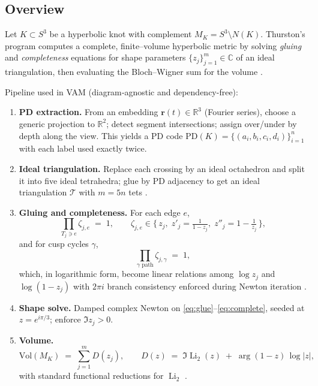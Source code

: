 \documentclass[10pt,reprint,aps,onecolumn,nofootinbib]{revtex4-2}
\begin{document}
\subsection{Overview}
    Let \(K\subset S^3\) be a hyperbolic knot with complement \(M_K = S^3\setminus N(K)\).
    Thurston’s program computes a complete, finite–volume hyperbolic metric by solving \emph{gluing} and \emph{completeness} equations for shape parameters \(\{z_j\}_{j=1}^m\in\mathbb{C}\) of an ideal triangulation, then evaluating the Bloch–Wigner sum for the volume \cite{ThurstonNotes,NeumannZagier1985,AdamsWeeks1992}.

    Pipeline used in VAM (diagram‐agnostic and dependency-free):

    \begin{enumerate}
        \item \textbf{PD extraction.} From an embedding \( \mathbf{r}(t)\in\mathbb{R}^3 \) (Fourier series), choose a generic projection to \(\mathbb{R}^2\); detect segment intersections; assign over/under by depth along the view. This yields a PD code \(\mathrm{PD}(K)=\{(a_i,b_i,c_i,d_i)\}_{i=1}^n\) with each label used exactly twice.
        \item \textbf{Ideal triangulation.} Replace each crossing by an ideal octahedron and split it into five ideal tetrahedra; glue by PD adjacency to get an ideal triangulation \(\mathcal{T}\) with \(m=5n\) tets \cite{ThurstonNotes,AdamsWeeks1992}.
        \item \textbf{Gluing and completeness.} For each edge \(e\),
        \begin{equation}
            \prod_{T_j\ni e} \zeta_{j,e} \;=\; 1,
            \qquad
            \zeta_{j,e}\in\{\,z_j,\; z'_j=\tfrac{1}{1-z_j},\; z''_j=1-\tfrac{1}{z_j}\,\},
            \label{eq:glue}
        \end{equation}
        and for cusp cycles \(\gamma\),
        \begin{equation}
            \prod_{\gamma\text{ path}} \zeta_{j,\gamma} \;=\; 1,
            \label{eq:complete}
        \end{equation}
        which, in logarithmic form, become linear relations among \(\log z_j\) and \(\log(1-z_j)\) with \(2\pi i\) branch consistency enforced during Newton iteration \cite{NeumannZagier1985}.
        \item \textbf{Shape solve.} Damped complex Newton on \eqref{eq:glue}–\eqref{eq:complete}, seeded at \(z=e^{i\pi/3}\); enforce \(\Im z_j>0\).
        \item \textbf{Volume.}
        \begin{equation}
            \mathrm{Vol}(M_K) \;=\; \sum_{j=1}^m D(z_j),
            \qquad
            D(z) \;=\; \Im\!\operatorname{Li}_2(z) \;+\; \arg(1-z)\,\log|z|,
            \label{eq:BW}
        \end{equation}
        with standard functional reductions for \(\operatorname{Li}_2\) \cite{Lewin1981,NeumannZagier1985}.
    \end{enumerate}
\end{document}

